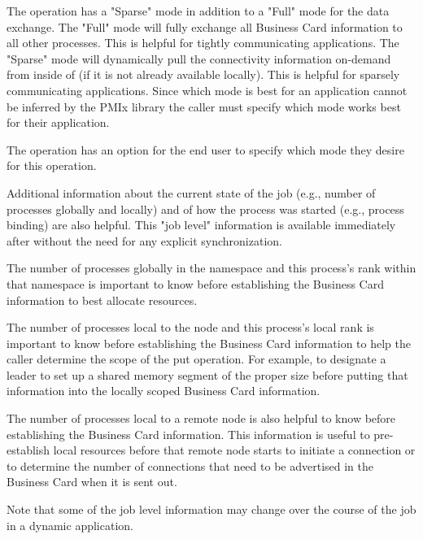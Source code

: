 The  operation has a "Sparse" mode in addition to a "Full" mode for the data exchange. The "Full" mode will fully exchange all Business Card information to all other processes. This is helpful for tightly communicating applications. The "Sparse" mode will dynamically pull the connectivity information on-demand from inside of  (if it is not already available locally). This is helpful for sparsely communicating applications. Since which mode is best for an application cannot be inferred by the PMIx library the caller must specify which mode works best for their application.

The  operation has an option for the end user to specify which mode they desire for this operation.

Additional information about the current state of the job (e.g., number of processes globally and locally) and of how the process was started (e.g., process binding) are also helpful. This "job level" information is available immediately after  without the need for any explicit synchronization.

The number of processes globally in the namespace and this process's rank within that namespace is important to know before establishing the Business Card information to best allocate resources.

The number of processes local to the node and this process's local rank is important to know before establishing the Business Card information to help the caller determine the scope of the put operation. For example, to designate a leader to set up a shared memory segment of the proper size before putting that information into the locally scoped Business Card information.

The number of processes local to a remote node is also helpful to know before establishing the Business Card information. This information is useful to pre-establish local resources before that remote node starts to initiate a connection or to determine the number of connections that need to be advertised in the Business Card when it is sent out.

Note that some of the job level information may change over the course of the job in a dynamic application.


{\large {}}

{\large {}}

